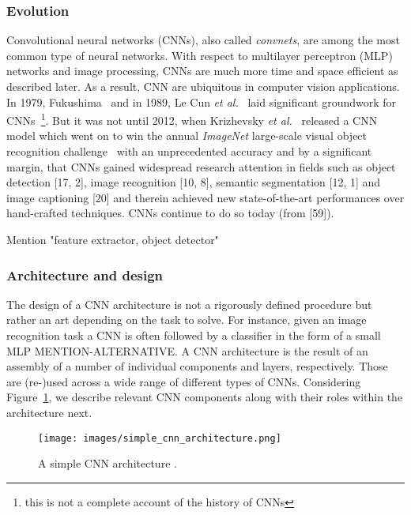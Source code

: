 \documentclass[12pt,a4paper]{article}
\begin{document}
\subsubsection{Evolution}
Convolutional neural networks (CNNs), also called \textit{convnets}, are among the most common type of neural networks. With respect to multilayer perceptron (MLP) networks and image processing, CNNs are much more time and space efficient as described later. As a result, CNN are ubiquitous in computer vision applications. In 1979, Fukushima~\cite{FukushimaCnn79} and in 1989, Le Cun \textit{et al.}~\cite{CunGrounworkCNNs} laid significant groundwork for CNNs~\footnote{this is not a complete account of the history of CNNs}. But it was not until 2012, when Krizhevsky \textit{et al.}~\cite{AlexNet} released a CNN model which went on to win the annual \textit{ImageNet} large-scale visual object recognition challenge~\cite{Imagenet} with an unprecedented accuracy and by a significant margin, that CNNs gained widespread research attention in fields such as object detection [17, 2], image recognition [10, 8], semantic segmentation [12, 1] and image captioning [20] and therein achieved new state-of-the-art performances over hand-crafted techniques. CNNs continue to do so today (from [59]).
\par [62] Mention "feature extractor, object detector"

\subsubsection{Architecture and design}
The design of a CNN architecture is not a rigorously defined procedure but rather an art depending on the task to solve. For instance, given an image recognition task a CNN is often followed by a classifier in the form of a small MLP MENTION-ALTERNATIVE. A CNN architecture is the result of an assembly of a number of individual components and layers, respectively. Those are (re-)used across a wide range of different types of CNNs. Considering Figure~\ref{fig:simple_cnn_arch}, we describe relevant CNN components along with their roles within the architecture  next. 
\begin{figure}[H]
\centering
\texttt{[image: images/simple\_cnn\_architecture.png]}
\caption{A simple CNN architecture \cite{cnn_arch_article}.}
\label{fig:simple_cnn_arch}
\end{figure}
\end{document}
